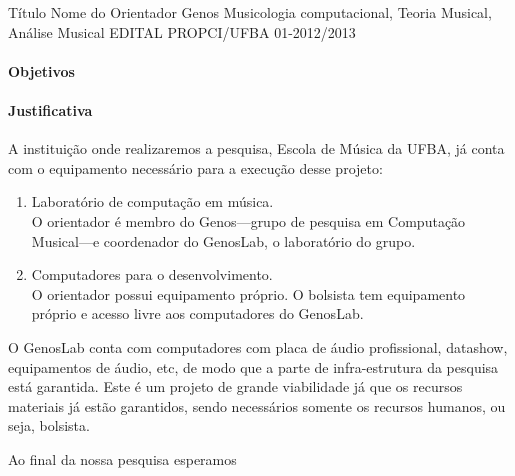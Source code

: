 \documentclass[11pt]{article}
\begin{document}

\dadosProjetoOrientador
{Título}
{Nome do Orientador}
{Genos}
{Musicologia computacional, Teoria Musical, Análise Musical}
{EDITAL PROPCI/UFBA 01-2012/2013}

\newpage

\onehalfspace



\paragraph{Objetivos}
\label{sec:objetivos}


\paragraph{Justificativa}
\label{sec:justificativa}



\begin{enumerate}
\end{enumerate}


A instituição onde realizaremos a pesquisa, Escola de Música da UFBA,
já conta com o equipamento necessário para a execução desse projeto:

\begin{enumerate}
\item Laboratório de computação em música. \\
  O orientador é membro do Genos---grupo de pesquisa em Computação
  Musical---e coordenador do GenosLab, o laboratório do grupo.
\item Computadores para o desenvolvimento.\\
  O orientador possui equipamento próprio. O bolsista tem equipamento
  próprio e acesso livre aos computadores do GenosLab.
\end{enumerate}

O GenosLab conta com computadores com placa de áudio profissional,
datashow, equipamentos de áudio, etc, de modo que a parte de
infra-estrutura da pesquisa está garantida. Este é um projeto de
grande viabilidade já que os recursos materiais já estão garantidos,
sendo necessários somente os recursos humanos, ou seja, bolsista.


Ao final da nossa pesquisa esperamos
\end{document}
